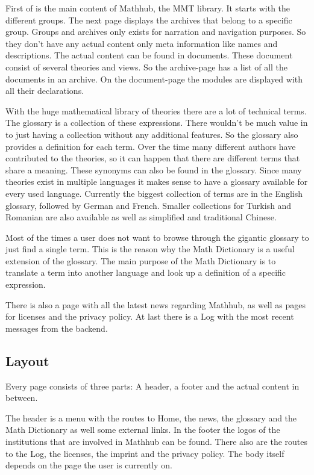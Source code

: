\documentclass[11pt,a4paper]{article}
\begin{document}
First of is the main content of Mathhub, the MMT library.
It starts with the different groups.
The next page displays the archives that belong to a specific group.
Groups and archives only exists for narration and navigation purposes.
So they don't have any actual content only meta information like names and descriptions.
The actual content can be found in documents.
These document consist of several theories and views.
So the archive-page has a list of all the documents in an archive.
On the document-page the modules are displayed with all their declarations.


With the huge mathematical library of theories there are a lot of technical terms.
The glossary is a collection of these expressions.
There wouldn't be much value in to just having a collection without any additional features.
So the glossary also provides a definition for each term.
Over the time many different authors have contributed to the theories, so it can happen that there are different terms that share a meaning.
These synonyms can also be found in the glossary.
Since many theories exist in multiple languages it makes sense to have a glossary available for every used language.
Currently the biggest collection of terms are in the English glossary, followed by German and French.
Smaller collections for Turkish and Romanian are also available as well as simplified and traditional Chinese.

Most of the times a user does not want to browse through the gigantic glossary to just find a single term.
This is the reason why the Math Dictionary is a useful extension of the glossary.
The main purpose of the Math Dictionary is to translate a term into another language and look up a definition of a specific expression.


There is also a page with all the latest news regarding Mathhub,  as well as pages for licenses and the privacy policy.
At last there is a Log with the most recent messages from the backend. 

\subsection{Layout}
Every page consists of three parts: A header, a footer and the actual content in between.

The header is a menu with the routes to Home, the news, the glossary and the Math Dictionary as well some external links.
In the footer the logos of the institutions that are involved in Mathhub can be found.
There also are the routes to the Log, the licenses, the imprint and the privacy policy.
The body itself depends on the page the user is currently on.
\end{document}

